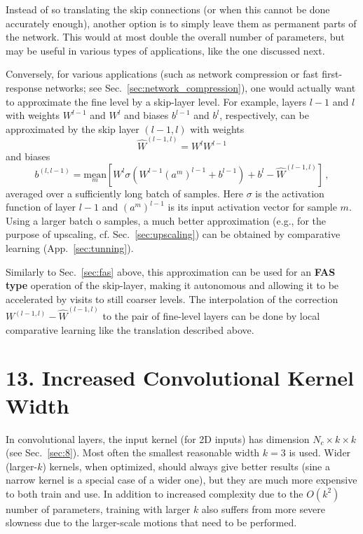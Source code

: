 \documentclass{article} %
\begin{document}
Instead of so translating the skip connections (or when this cannot be done accurately enough), another option is to simply leave them as permanent parts of the network. This would at most double the overall number of parameters, but may be useful in various types of applications, like the one discussed next.

Conversely, for various applications (such as network compression or fast first-response networks; see Sec.~\ref{sec:network_compression}), one would actually want to approximate the fine level by a skip-layer level. For example, layers $l-1$ and $l$ with weights $W^{l-1}$ and $W^l$ and biases $b^{l-1}$ and $b^l$, respectively, can be approximated by the skip layer $(l-1,l)$ with weights
$$ \hat{W}^{(l-1,l)} = W^l W^{l-1} $$
and biases
$$ b^{(l,l-1)} = \underset{m}{\mathrm{mean}} \left[ W^l \sigma(W^{l-1}(a^m)^{l-1} + b^{l-1}) + b^l - \hat{W}^{(l-1,l)} \right]\,,$$
averaged over a sufficiently long batch of samples. Here $\sigma$ is the activation function of layer $l-1$ and $(a^m)^{l-1}$ is its input activation vector for sample $m$. Using a larger batch o samples, a much better approximation (e.g., for the purpose of upscaling, cf. Sec.~\ref{sec:upscaling}) can be obtained by comparative learning (App.~\ref{sec:tunning}).

Similarly to Sec.~\ref{sec:fas} above, this approximation can be used for an \textbf{FAS type} operation of the skip-layer, making it autonomous and allowing it to be accelerated by visits to still coarser levels. The interpolation of the correction $ W^{(l-1,l)}  - \hat{W}^{(l-1,l)}$ to the pair of fine-level layers can be done by local comparative learning like the translation described above.

\section{13. Increased Convolutional Kernel Width}
\label{sec:extended_region}
In convolutional layers, the input kernel (for 2D inputs) has dimension $N_c \times k \times k$ (see Sec.~\ref{sec:8}). Most often the smallest reasonable width $k = 3$ is used. Wider (larger-$k$) kernels, when optimized, should always give better results (sine a narrow kernel is a special case of a wider one), but they are much more expensive to both train and use. In addition  to increased complexity due to the $O(k^2)$ number of parameters, training with larger $k$ also suffers from more severe slowness due to the larger-scale motions that need to be performed.
\end{document}
